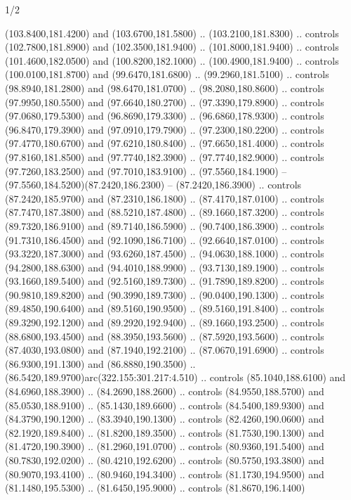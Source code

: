 \begin{flagdescription}{1/2}
\begin{scope}[xshift=\flaglength/6]
\begin{scope}[scale=0.00247\flagwidth,yshift=241mm,xshift=-27.1mm]
\begin{scope}[y=0.80pt, x=0.80pt, yscale=-0.9, xscale=1]
\begin{scope}[shift={(-53.94897,373.26853)},draw=red]
  (103.8400,181.4200) and (103.6700,181.5800) .. (103.2100,181.8300) .. controls
  (102.7800,181.8900) and (102.3500,181.9400) .. (101.8000,181.9400) .. controls
  (101.4600,182.0500) and (100.8200,182.1000) .. (100.4900,181.9400) .. controls
  (100.0100,181.8700) and (99.6470,181.6800) .. (99.2960,181.5100) .. controls
  (98.8940,181.2800) and (98.6470,181.0700) .. (98.2080,180.8600) .. controls
  (97.9950,180.5500) and (97.6640,180.2700) .. (97.3390,179.8900) .. controls
  (97.0680,179.5300) and (96.8690,179.3300) .. (96.6860,178.9300) .. controls
  (96.8470,179.3900) and (97.0910,179.7900) .. (97.2300,180.2200) .. controls
  (97.4770,180.6700) and (97.6210,180.8400) .. (97.6650,181.4000) .. controls
  (97.8160,181.8500) and (97.7740,182.3900) .. (97.7740,182.9000) .. controls
  (97.7260,183.2500) and (97.7010,183.9100) .. (97.5560,184.1900) --
  (97.5560,184.5200)(87.2420,186.2300) -- (87.2420,186.3900) .. controls
  (87.2420,185.9700) and (87.2310,186.1800) .. (87.4170,187.0100) .. controls
  (87.7470,187.3800) and (88.5210,187.4800) .. (89.1660,187.3200) .. controls
  (89.7320,186.9100) and (89.7140,186.5900) .. (90.7400,186.3900) .. controls
  (91.7310,186.4500) and (92.1090,186.7100) .. (92.6640,187.0100) .. controls
  (93.3220,187.3000) and (93.6260,187.4500) .. (94.0630,188.1000) .. controls
  (94.2800,188.6300) and (94.4010,188.9900) .. (93.7130,189.1900) .. controls
  (93.1660,189.5400) and (92.5160,189.7300) .. (91.7890,189.8200) .. controls
  (90.9810,189.8200) and (90.3990,189.7300) .. (90.0400,190.1300) .. controls
  (89.4850,190.6400) and (89.5160,190.9500) .. (89.5160,191.8400) .. controls
  (89.3290,192.1200) and (89.2920,192.9400) .. (89.1660,193.2500) .. controls
  (88.6800,193.4500) and (88.3950,193.5600) .. (87.5920,193.5600) .. controls
  (87.4030,193.0800) and (87.1940,192.2100) .. (87.0670,191.6900) .. controls
  (86.9300,191.1300) and (86.8880,190.3500) ..
  (86.5420,189.9700)arc(322.155:301.217:4.510) .. controls (85.1040,188.6100)
  and (84.6960,188.3900) .. (84.2690,188.2600) .. controls (84.9550,188.5700)
  and (85.0530,188.9100) .. (85.1430,189.6600) .. controls (84.5400,189.9300)
  and (84.3790,190.1200) .. (83.3940,190.1300) .. controls (82.4260,190.0600)
  and (82.1920,189.8400) .. (81.8200,189.3500) .. controls (81.7530,190.1300)
  and (81.4720,190.3900) .. (81.2960,191.0700) .. controls (80.9360,191.5400)
  and (80.7830,192.0200) .. (80.4210,192.6200) .. controls (80.5750,193.3800)
  and (80.9070,193.4100) .. (80.9460,194.3400) .. controls (81.1730,194.9500)
  and (81.1480,195.5300) .. (81.6450,195.9000) .. controls (81.8670,196.1400)

\end{scope}
\end{scope}
\end{scope}
\end{scope}
\end{flagdescription}
